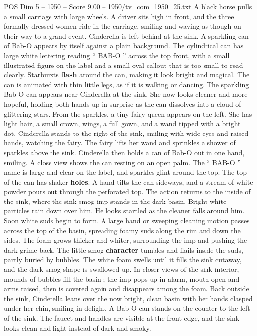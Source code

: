 \begin{textsample}{POS Dim 5 – 1950 – Score 9.00 – 1950/tv\_com\_1950\_25.txt}
A black horse pulls a small carriage with large wheels.
A driver sits high in front, and the three formally dressed women ride in the carriage, smiling and waving as though on their way to a grand event.
Cinderella is left behind at the sink.
A sparkling can of Bab-O appears by itself against a plain background.
The cylindrical can has large white lettering reading “ BAB-O ” across the top front, with a small illustrated figure on the label and a small oval callout that is too small to read clearly.
Starbursts \textbf{flash} around the can, making it look bright and magical.
The can is animated with thin little legs, as if it is walking or dancing.
The sparkling Bab-O can appears near Cinderella at the sink.
She now looks cleaner and more hopeful, holding both hands up in surprise as the can dissolves into a cloud of glittering stars.
From the sparkles, a tiny fairy queen appears on the left.
She has light hair, a small crown, wings, a full gown, and a wand tipped with a bright dot.
Cinderella stands to the right of the sink, smiling with wide eyes and raised hands, watching the fairy.
The fairy lifts her wand and sprinkles a shower of sparkles above the sink.
Cinderella then holds a can of Bab-O out in one hand, smiling.
A close view shows the can resting on an open palm.
The “ BAB-O ” name is large and clear on the label, and sparkles glint around the top.
The top of the can has shaker \textbf{holes}.
A hand tilts the can sideways, and a stream of white powder pours out through the perforated top.
The action returns to the inside of the sink, where the sink-smog imp stands in the dark basin.
Bright white particles rain down over him.
He looks startled as the cleaner falls around him.
Soon white suds begin to form.
A large hand or sweeping cleaning motion passes across the top of the basin, spreading foamy suds along the rim and down the sides.
The foam grows thicker and whiter, surrounding the imp and pushing the dark grime back.
The little smog \textbf{character} tumbles and flails inside the suds, partly buried by bubbles.
The white foam swells until it fills the sink cutaway, and the dark smog shape is swallowed up.
In closer views of the sink interior, mounds of bubbles fill the basin ; the imp pops up in alarm, mouth open and arms raised, then is covered again and disappears among the foam.
Back outside the sink, Cinderella leans over the now bright, clean basin with her hands clasped under her chin, smiling in delight.
A Bab-O can stands on the counter to the left of the sink.
The faucet and handles are visible at the front edge, and the sink looks clean and light instead of dark and smoky.

\end{textsample}
